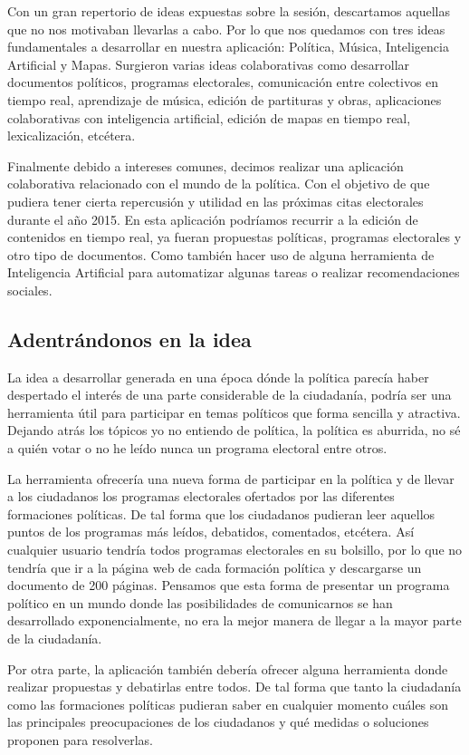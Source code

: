 Con un gran repertorio de ideas expuestas sobre la sesión, descartamos aquellas que no nos motivaban llevarlas a cabo. Por lo que nos quedamos con tres ideas fundamentales a desarrollar en nuestra aplicación: Política, Música, Inteligencia Artificial y Mapas. Surgieron varias ideas colaborativas como desarrollar documentos políticos, programas electorales, comunicación entre colectivos en tiempo real, aprendizaje de música, edición de partituras y obras, aplicaciones colaborativas con inteligencia artificial, edición de mapas en tiempo real, lexicalización, etcétera.

Finalmente debido a intereses comunes, decimos realizar una aplicación colaborativa relacionado con el mundo de la política. Con el objetivo de que pudiera tener cierta repercusión y utilidad en las próximas citas electorales durante el año 2015. En esta aplicación podríamos recurrir a la edición de contenidos en tiempo real, ya fueran propuestas políticas, programas electorales y otro tipo de documentos. Como también hacer uso de alguna herramienta de Inteligencia Artificial para automatizar algunas tareas o realizar recomendaciones sociales.

\subsection{Adentrándonos en la idea}
La idea a desarrollar generada en una época dónde la política parecía haber despertado el interés de una parte considerable de la ciudadanía, podría ser una herramienta útil para participar en temas políticos que forma sencilla y atractiva. Dejando atrás los tópicos yo no entiendo de política, la política es aburrida, no sé a quién votar o no he leído nunca un programa electoral entre otros.

La herramienta ofrecería una nueva forma de participar en la política y de llevar a los ciudadanos los programas electorales ofertados por las diferentes formaciones políticas. De tal forma que los ciudadanos pudieran leer aquellos puntos de los programas más leídos, debatidos, comentados, etcétera. Así cualquier usuario tendría todos programas electorales en su bolsillo, por lo que no tendría que ir a la página web de cada formación política y descargarse un documento de 200 páginas. Pensamos que esta forma de presentar un programa político en un mundo donde las posibilidades de  comunicarnos se han desarrollado exponencialmente, no era la mejor manera de llegar a la mayor parte de la ciudadanía.

Por otra parte, la aplicación también debería ofrecer alguna herramienta donde realizar propuestas y debatirlas entre todos. De tal forma que tanto la ciudadanía como las formaciones políticas pudieran saber en cualquier momento cuáles son las principales preocupaciones de los ciudadanos y qué medidas o soluciones proponen para resolverlas.

